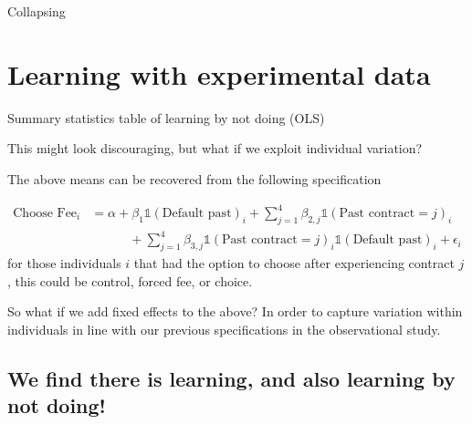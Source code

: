 \documentclass[oneside,11pt]{article}
\begin{document}
\begin{table}[H]
\caption{Collapsing}
\begin{center}
\scriptsize{}
\end{center}
 \scriptsize

\end{table}







\section{Learning with experimental data}



\begin{table}[H]
\caption{Summary statistics table of learning by not doing (OLS)}
\begin{center}
\scriptsize{}
\end{center}
 \scriptsize

\end{table}
 
This might look discouraging, but what if we exploit individual variation?

The above means can be recovered from the following specification

\begin{align*}
    \text{Choose Fee}_{i} &=  \alpha +  \beta_1\mathds{1}(\text{Default past})_{i} +\sum_{j=1}^{4}\beta_{2,j}\mathds{1}(\text{Past contract}=j)_{i} \\
   &\qquad\quad  +\sum_{j=1}^{4}\beta_{3,j}\mathds{1}(\text{Past contract}=j)_{i}\mathds{1}(\text{Default past})_{i} + \epsilon_i
\end{align*}
for those individuals $i$ that had the option to choose after experiencing contract $j$, this could be control, forced fee, or choice. 

So what if we add fixed effects to the above? In order to capture variation within individuals in line with our previous specifications in the observational study.

\subsection*{We find there is learning, and also learning by not doing!}
\end{document}
